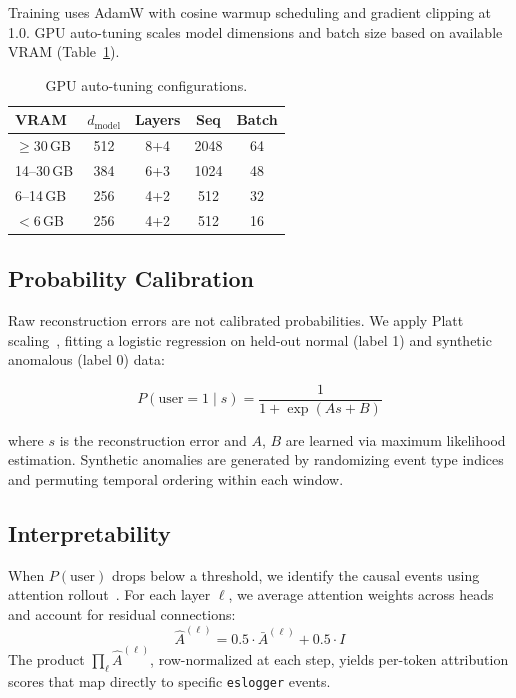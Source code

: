 \documentclass[letterpaper,twocolumn,10pt]{article}
\begin{document}
Training uses AdamW with cosine warmup scheduling and gradient
clipping at 1.0. GPU auto-tuning scales model dimensions and batch
size based on available VRAM (Table~\ref{tab:gpu_tiers}).

\begin{table}[t]
\centering
\caption{GPU auto-tuning configurations.}
\label{tab:gpu_tiers}
\small
\begin{tabular}{@{}lcccc@{}}
\toprule
\textbf{VRAM} & $d_{\text{model}}$ & \textbf{Layers} & \textbf{Seq} & \textbf{Batch} \\
\midrule
$\geq$30\,GB & 512 & 8+4 & 2048 & 64 \\
14--30\,GB & 384 & 6+3 & 1024 & 48 \\
6--14\,GB & 256 & 4+2 & 512 & 32 \\
$<$6\,GB & 256 & 4+2 & 512 & 16 \\
\bottomrule
\end{tabular}
\end{table}

\subsection{Probability Calibration}

Raw reconstruction errors are not calibrated probabilities. We
apply Platt scaling~\cite{platt}, fitting a logistic regression on
held-out normal (label 1) and synthetic anomalous (label 0) data:

\begin{equation}
P(\text{user}=1 \mid s) = \frac{1}{1 + \exp(As + B)}
\end{equation}

\noindent where $s$ is the reconstruction error and $A$, $B$ are
learned via maximum likelihood estimation. Synthetic anomalies are
generated by randomizing event type indices and permuting temporal
ordering within each window.

\subsection{Interpretability}

When $P(\text{user})$ drops below a threshold, we identify the
causal events using attention rollout~\cite{abnar2020rollout}.
For each layer $\ell$, we average attention weights across heads
and account for residual connections:
\begin{equation}
\hat{A}^{(\ell)} = 0.5 \cdot \bar{A}^{(\ell)} + 0.5 \cdot I
\end{equation}
The product $\prod_\ell \hat{A}^{(\ell)}$, row-normalized at each
step, yields per-token attribution scores that map directly to
specific \texttt{eslogger} events.
\end{document}
